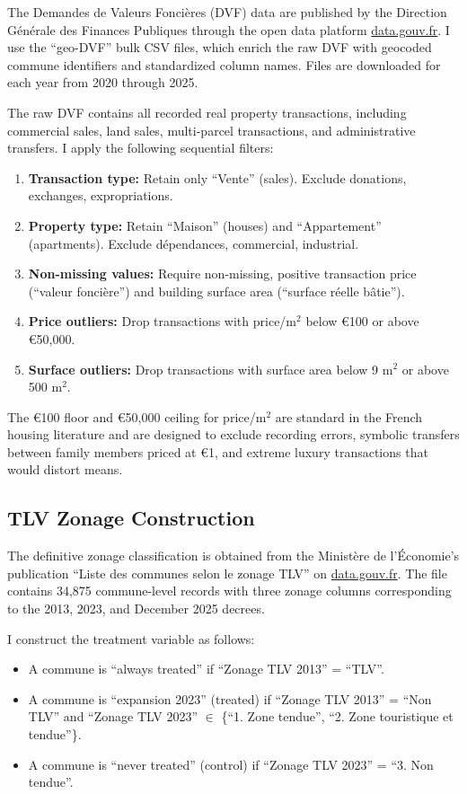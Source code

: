 \documentclass[12pt]{article}
\begin{document}
{The Demandes de Valeurs Fonci\`eres (DVF) data are published by the Direction G\'en\'erale des Finances Publiques through the open data platform \url{data.gouv.fr}. I use the ``geo-DVF'' bulk CSV files, which enrich the raw DVF with geocoded commune identifiers and standardized column names. Files are downloaded for each year from 2020 through 2025.

The raw DVF contains all recorded real property transactions, including commercial sales, land sales, multi-parcel transactions, and administrative transfers. I apply the following sequential filters:

\begin{enumerate}
    \item \textbf{Transaction type:} Retain only ``Vente'' (sales). Exclude donations, exchanges, expropriations.
    \item \textbf{Property type:} Retain ``Maison'' (houses) and ``Appartement'' (apartments). Exclude d\'ependances, commercial, industrial.
    \item \textbf{Non-missing values:} Require non-missing, positive transaction price (``valeur fonci\`ere'') and building surface area (``surface r\'eelle b\^atie'').
    \item \textbf{Price outliers:} Drop transactions with price/m$^2$ below \euro{100} or above \euro{50,000}.
    \item \textbf{Surface outliers:} Drop transactions with surface area below 9 m$^2$ or above 500 m$^2$.
\end{enumerate}

The \euro{100} floor and \euro{50,000} ceiling for price/m$^2$ are standard in the French housing literature and are designed to exclude recording errors, symbolic transfers between family members priced at \euro{1}, and extreme luxury transactions that would distort means.

\subsection{TLV Zonage Construction}

The definitive zonage classification is obtained from the Minist\`ere de l'\'Economie's publication ``Liste des communes selon le zonage TLV'' on \url{data.gouv.fr}. The file contains 34,875 commune-level records with three zonage columns corresponding to the 2013, 2023, and December 2025 decrees.

I construct the treatment variable as follows:
\begin{itemize}
    \item A commune is ``always treated'' if ``Zonage TLV 2013'' = ``TLV''.
    \item A commune is ``expansion 2023'' (treated) if ``Zonage TLV 2013'' = ``Non TLV'' and ``Zonage TLV 2023'' $\in$ \{``1. Zone tendue'', ``2. Zone touristique et tendue''\}.
    \item A commune is ``never treated'' (control) if ``Zonage TLV 2023'' = ``3. Non tendue''.
\end{itemize}

}
\end{document}
